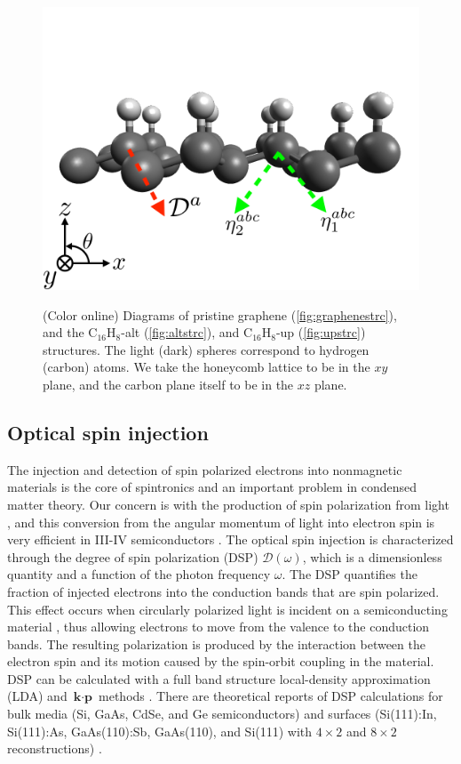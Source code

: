 \documentclass[pss]{wiley2sp} %
\begin{document}
\begin{figure}[t]
{\includegraphics[width=0.49\linewidth]{figures/up2}\label{fig:upstrc}}
\caption{(Color online) Diagrams of pristine graphene
(\ref{fig:graphenestrc}), and the C$_{16}$H$_{8}$-alt (\ref{fig:altstrc}), and
C$_{16}$H$_{8}$-up (\ref{fig:upstrc}) structures. The light (dark) spheres
correspond to hydrogen (carbon) atoms. We take the honeycomb lattice to be in
the $xy$ plane, and the carbon plane itself to be in the $xz$
plane.\label{fig:structures}}
\end{figure}



\subsection{Optical spin injection}

The injection and detection of spin polarized electrons into nonmagnetic
materials is the core of spintronics \cite{vzuticRMP04,fertRMP08} and an
important  problem in condensed matter theory. Our concern is with the
production of spin polarization from light \cite{LampelPRL68}, and this
conversion from the angular momentum of light into electron spin is very
efficient in III-IV semiconductors \cite{dyakonovOO84}. The optical spin
injection is characterized through the degree of spin polarization (DSP)
$\mathcal{D}(\omega)$, which is a dimensionless quantity and a function of the
photon frequency $\omega$. The DSP quantifies the fraction of injected
electrons into the conduction bands that are spin polarized. This effect
occurs when circularly polarized light is incident on a semiconducting
material \cite{dyakonovOO84}, thus allowing electrons to move from the valence
to the conduction bands. The resulting polarization is produced by the
interaction between the electron spin and its motion caused by the spin-orbit
coupling in the material. DSP can be calculated with a full band structure
local-density approximation (LDA) and $\textbf{k}\cdot\textbf{p}$ methods
\cite{nastosPRB07,cabellosPRB09}. There are theoretical reports of DSP
calculations for bulk media (Si, GaAs, CdSe, and Ge semiconductors)
\cite{nastosPRB07,cabellosPRB09} and surfaces (Si(111):In, Si(111):As,
GaAs(110):Sb, GaAs(110), and Si(111) with $4\times2$ and $8\times2$
reconstructions) \cite{mendozaPRB12,arzatePRB14}.
\end{document}
